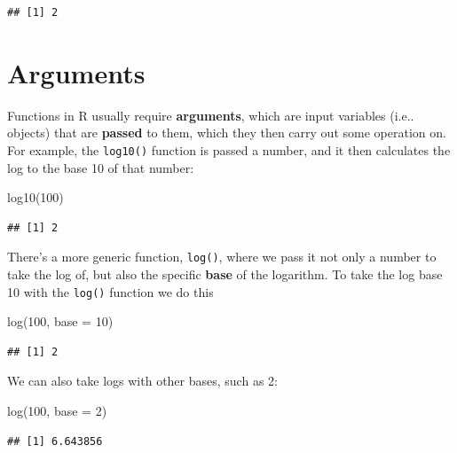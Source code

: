 \documentclass[
]{book}
\newenvironment{Shaded}{\begin{snugshade}}{\end{snugshade}}
\newcommand{\AttributeTok}[1]{\textcolor[rgb]{0.77,0.63,0.00}{#1}}
\newcommand{\DecValTok}[1]{\textcolor[rgb]{0.00,0.00,0.81}{#1}}
\newcommand{\FunctionTok}[1]{\textcolor[rgb]{0.00,0.00,0.00}{#1}}
\newcommand{\NormalTok}[1]{#1}
\begin{document}
\begin{verbatim}
## [1] 2
\end{verbatim}

\hypertarget{arguments}{%
\section{Arguments}\label{arguments}}

Functions in R usually require \textbf{arguments}, which are input variables (i.e.. objects) that are \textbf{passed} to them, which they then carry out some operation on. For example, the \texttt{log10()} function is passed a number, and it then calculates the log to the base 10 of that number:

\begin{Shaded}
\begin{Highlighting}[]
\FunctionTok{log10}\NormalTok{(}\DecValTok{100}\NormalTok{)}
\end{Highlighting}
\end{Shaded}

\begin{verbatim}
## [1] 2
\end{verbatim}

There's a more generic function, \texttt{log()}, where we pass it not only a number to take the log of, but also the specific \textbf{base} of the logarithm. To take the log base 10 with the \texttt{log()} function we do this

\begin{Shaded}
\begin{Highlighting}[]
\FunctionTok{log}\NormalTok{(}\DecValTok{100}\NormalTok{, }\AttributeTok{base =} \DecValTok{10}\NormalTok{)}
\end{Highlighting}
\end{Shaded}

\begin{verbatim}
## [1] 2
\end{verbatim}

We can also take logs with other bases, such as 2:

\begin{Shaded}
\begin{Highlighting}[]
\FunctionTok{log}\NormalTok{(}\DecValTok{100}\NormalTok{, }\AttributeTok{base =} \DecValTok{2}\NormalTok{)}
\end{Highlighting}
\end{Shaded}

\begin{verbatim}
## [1] 6.643856
\end{verbatim}
\end{document}
